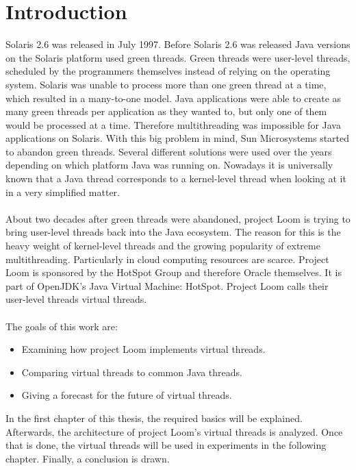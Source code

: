 \chapter{Introduction}
Solaris 2.6  was released in July 1997. \cite{wiki:solaris} Before Solaris 2.6 was released Java versions on the Solaris platform used green threads.
Green threads were user-level threads, scheduled by the programmers themselves instead of relying on the operating system. Solaris was unable to process more than one green thread at a time, which resulted in a many-to-one model. Java applications were able to create as many green threads per application as they wanted to, but only one of them would be processed at a time. Therefore multithreading was impossible for Java applications on Solaris. \cite{oracle:solaris} With this big problem in mind, Sun Microsystems started to abandon green threads.
Several different solutions were used over the years depending on which platform Java was running on. Nowadays it is universally known that a Java thread corresponds to a kernel-level thread when looking at it in a very simplified matter.
\\
\\
About two decades after green threads were abandoned, project Loom is trying to bring user-level threads back into the Java ecosystem. The reason for this is the heavy weight of kernel-level threads and the growing popularity of extreme multithreading. Particularly in cloud computing resources are scarce. Project Loom is sponsored by the HotSpot Group and therefore Oracle themselves. It is part of OpenJDK's Java Virtual Machine: HotSpot. Project Loom calls their user-level threads virtual threads. \cite{loom:proposal}
\\
\\
The goals of this work are:
\begin{itemize}
    \item Examining how project Loom implements virtual threads.
    \item Comparing virtual threads to common Java threads.
    \item Giving a forecast for the future of virtual threads.
\end{itemize}
In the first chapter of this thesis, the required basics will be explained. Afterwards, the architecture of project Loom's virtual threads is analyzed. Once that is done, the virtual threads will be used in experiments in the following chapter. Finally, a conclusion is drawn.




